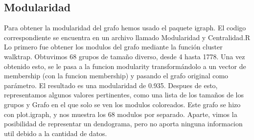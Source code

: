 \subsection{Modularidad}

Para obtener la modularidad del grafo hemos usado el paquete igraph. El codigo correspondiente se encuentra en un archivo llamado Modularidad y Centralidad.R
Lo primero fue obtener los modulos del grafo mediante la función cluster walktrap. Obtuvimos 68 grupos de tamaño diverso, desde 4 hasta 1778. Una vez obtenido esto, se le pasa a la funcion modularity transformándolo a un vector de membership (con la funcion membership) y pasando el grafo original como parámetro. El resultado es una modularidad de 0.935.
Despues de esto, representamos algunos valores pertinentes, como una lista de los tamaños de los grupos y Grafo en el que solo se ven los modulos coloreados.
Este grafo se hizo con plot.igraph, y nos muestra los 68 modulos por separado.
Aparte, vimos la posibilidad de representar un dendograma, pero no aporta ninguna informacion util debido a la cantidad de datos.




